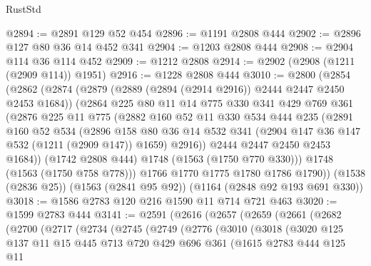 \begin{lexlean}{RustStd}
\begin{coremodule}
@2894 := @2891 @129 @52 @454
@2896 := @1191 @2808 @444
@2902 := @2896 @127 @80 @36 @14 @452 @341
@2904 := @1203 @2808 @444
@2908 := @2904 @114 @36 @114 @452
@2909 := @1212 @2808
@2914 := @2902 (@2908 (@1211 (@2909 @114)) @1951)
@2916 := @1228 @2808 @444
@3010 := @2800
    (@2854
      (@2862
        (@2874
          (@2879 (@2889 (@2894 (@2914 @2916)) @2444 @2447 @2450 @2453 @1684))
          (@2864
            @225
            @80
            @11
            @14
            @775
            @330
            @341
            @429
            @769
            @361
            (@2876
              @225
              @11
              @775
              (@2882
                @160
                @52
                @11
                @330
                @534
                @444
                @235
                (@2891
                  @160
                  @52
                  @534
                  (@2896
                    @158
                    @80
                    @36
                    @14
                    @532
                    @341
                    (@2904 @147 @36 @147 @532 (@1211 (@2909 @147)) @1659)
                    @2916))
                @2444
                @2447
                @2450
                @2453
                @1684))
            (@1742 @2808 @444)
            @1748
            (@1563 (@1750 @770 @330)))
          @1748
          (@1563 (@1750 @758 @778)))
        @1766
        @1770
        @1775
        @1780
        @1786
        @1790))
    (@1538 (@2836 @25))
    (@1563 (@2841 @95 @92))
    (@1164 (@2848 @92 @193 @691 @330))
@3018 := @1586 @2783 @120 @216 @1590 @11 @714 @721 @463
@3020 := @1599 @2783 @444
@3141 := @2591
    (@2616
      (@2657
        (@2659
          (@2661
            (@2682
              (@2700
                (@2717
                  (@2734
                    (@2745
                      (@2749
                        (@2776
                          (@3010
                            (@3018
                              (@3020
                                @125
                                @137
                                @11
                                @15
                                @445
                                @713
                                @720
                                @429
                                @696
                                @361
                                (@1615
                                  @2783
                                  @444
                                  @125
                                  @11

\end{coremodule}
\end{lexlean}
